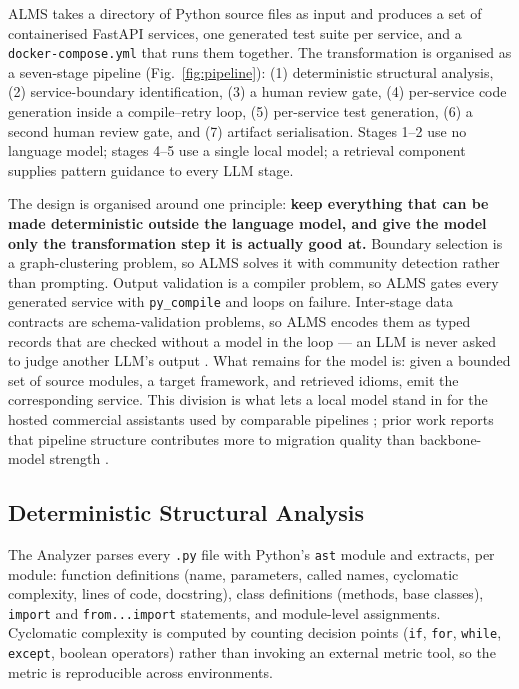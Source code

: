 \documentclass[conference]{IEEEtran}
\begin{document}
ALMS takes a directory of Python source files as input and produces a set of containerised FastAPI services, one generated test suite per service, and a \texttt{docker-compose.yml} that runs them together. The transformation is organised as a seven-stage pipeline (Fig.~\ref{fig:pipeline}): (1) deterministic structural analysis, (2) service-boundary identification, (3) a human review gate, (4) per-service code generation inside a compile--retry loop, (5) per-service test generation, (6) a second human review gate, and (7) artifact serialisation. Stages 1--2 use no language model; stages 4--5 use a single local model; a retrieval component supplies pattern guidance to every LLM stage.

The design is organised around one principle: \textbf{keep everything that can be made deterministic outside the language model, and give the model only the transformation step it is actually good at.} Boundary selection is a graph-clustering problem, so ALMS solves it with community detection rather than prompting. Output validation is a compiler problem, so ALMS gates every generated service with \texttt{py\_compile} and loops on failure. Inter-stage data contracts are schema-validation problems, so ALMS encodes them as typed records that are checked without a model in the loop --- an LLM is never asked to judge another LLM's output \cite{chen2026}. What remains for the model is: given a bounded set of source modules, a target framework, and retrieved idioms, emit the corresponding service. This division is what lets a local model stand in for the hosted commercial assistants used by comparable pipelines \cite{sellami2025,chen2026}; prior work reports that pipeline structure contributes more to migration quality than backbone-model strength \cite{chen2026}.

\subsection{Deterministic Structural Analysis}

The Analyzer parses every \texttt{.py} file with Python's \texttt{ast} module and extracts, per module: function definitions (name, parameters, called names, cyclomatic complexity, lines of code, docstring), class definitions (methods, base classes), \texttt{import} and \texttt{from...import} statements, and module-level assignments. Cyclomatic complexity is computed by counting decision points (\texttt{if}, \texttt{for}, \texttt{while}, \texttt{except}, boolean operators) rather than invoking an external metric tool, so the metric is reproducible across environments.
\end{document}
